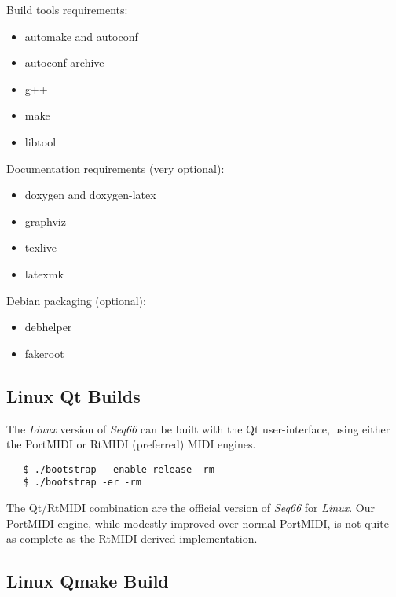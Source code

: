    Build tools requirements:

     \begin{itemize}
        \item automake and autoconf
        \item autoconf-archive
        \item g++
        \item make
        \item libtool
     \end{itemize}

   Documentation requirements (very optional):

     \begin{itemize}
        \item doxygen and doxygen-latex
        \item graphviz
        \item texlive
        \item latexmk
     \end{itemize}
      
   Debian packaging (optional):

     \begin{itemize}
        \item debhelper
        \item fakeroot
     \end{itemize}

\subsection{Linux Qt Builds}
\label{subsec:build_Qt}

   The \textsl{Linux} version of \textsl{Seq66} can be built with the Qt
   user-interface, using either the PortMIDI or RtMIDI (preferred) MIDI
   engines.
 
\begin{verbatim}
   $ ./bootstrap --enable-release -rm
   $ ./bootstrap -er -rm
\end{verbatim}

   The Qt/RtMIDI combination are the official version
   of \textsl{Seq66} for \textsl{Linux}.
   Our PortMIDI engine, while modestly improved over normal PortMIDI, is not
   quite as complete as the RtMIDI-derived implementation.

\subsection{Linux Qmake Build}
\label{subsec:build_qmake}

